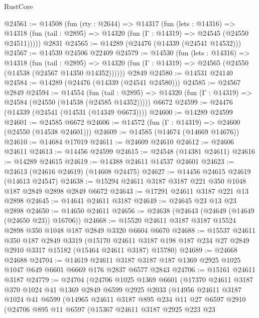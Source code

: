 \begin{lexlean}{RustCore}
\begin{coremodule}
@24561 := @14508
    (fun (rty : @2644) =>
    @14317
      (fun (lets : @14316) =>
      @14318 (fun (tail : @2895) => @14320 (fun (Γ : @14319) => @24545 (@24550 @24511)))))
    @2831
@24565 := @14289 (@24476 (@14339 (@24541 @14532)))
@24567 := @14539 @24506 @22409
@24579 := @14530
    (fun (lets : @14316) =>
    @14318
      (fun (tail : @2895) =>
      @14320 (fun (Γ : @14319) => @24565 (@24550 (@14538 (@24567 @14350 @14352))))))
    @2849
@24580 := @14531 @24140
@24584 := @14289 (@24476 (@14339 (@24541 @24580)))
@24585 := @24567 @2849
@24594 := @14554
    (fun (tail : @2895) => @14320 (fun (Γ : @14319) => @24584 (@24550 (@14538 (@24585 @14352)))))
    @6672
@24599 := @24476 (@14339 (@24541 (@14531 (@14349 @6673))))
@24600 := @14289 @24599
@24601 := @24585 @6672
@24606 := @14572 (fun (Γ : @14319) => @24600 (@24550 (@14538 @24601)))
@24609 := @14585 (@14674 (@14669 @14676))
@24610 := @14684 @17019
@24611 := @24609 @24610
@24612 := @24606 @24611
@24613 := @14456 @24599
@24615 := @24548 (@14381 @24611)
@24616 := @14289 @24615
@24619 := @14388 @24611 @14537 @24601
@24623 := @24613 (@24616 @24619) (@14608 @24475)
@24627 := @14456 @24615 @24619 (@14613 @24547)
@24638 := @15294 @24611 @3187 @3187 @221 @350 @1048 @187 @2849 @2898 @2849 @6672
@24643 := @17291 @24611 @3187 @221 @13 @2898
@24645 := @14641 @24611 @3187
@24649 := @24645 @23 @13 @23 @2898
@24650 := @14650 @24611
@24656 := @24638 (@24643 (@24649 (@14649 (@24650 @23)) @16706))
@24668 := @15520 @24611 @3187 @3187 @15524 @2898 @350 @1048 @187 @2849 @3320 @6604 @6670
@24688 := @15537
    @24611
    @350
    @187
    @2849
    @3319
    (@15170 @24611 @3187 @198 @187 @234 @27 @2849 @2910 @3317 @15182 (@15464 @24611 @3187) @15780)
@24689 := @24668 @24688
@24704 := @14619
    @24611
    @3187
    @3187
    @187
    @1369
    @2925
    @1025
    @1047
    @649
    @6601
    @6669
    @176
    @2837
    @6577
    @2843
@24706 := @15161 @24611 @3187
@24779 := @24704
    (@24706
      @1025
      @1369
      @6601
      (@17370
        @24611
        @3187
        @370
        @1024
        @41
        @1369
        @2849
        @6599
        @2925
        @2033
        (@14956
          @24611
          @3187
          @1024
          @41
          @6599
          (@14965
            @24611
            @3187
            @895
            @234
            @11
            @27
            @6597
            @2910
            (@24706
              @895
              @11
              @6597
              (@15367
                @24611
                @3187
                @2925
                @223
                @23

\end{coremodule}
\end{lexlean}
